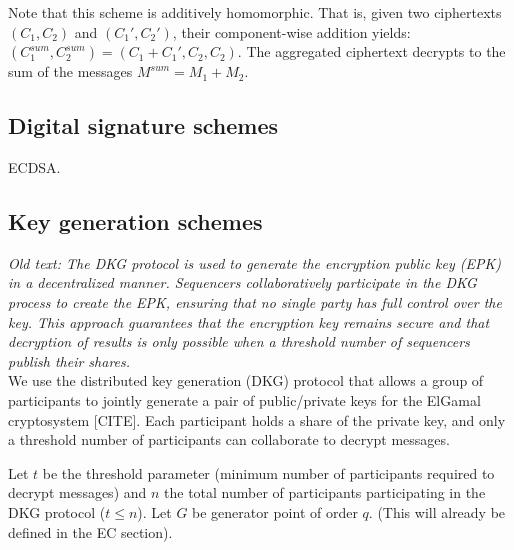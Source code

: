 Note that this scheme is additively homomorphic. That is, given two ciphertexts $(C_1, C_2)$ and $(C_1', C_2')$, their component-wise addition yields: $(C_1^{sum}, C_2^{sum}) = (C_1 + C_1', C_2, C_2)$. The aggregated ciphertext decrypts to the sum of the messages $M^{sum} = M_1 + M_2$.



\subsection{Digital signature schemes}
\label{sec:cryptographic-primitives:signatures}

ECDSA.

\subsection{Key generation schemes}
\label{sec:cryptographic-primitives:dkg}

\textit{Old text: The DKG protocol is used to generate the encryption public key (EPK) in a decentralized manner. Sequencers collaboratively participate in the DKG process to create the EPK, ensuring that no single party has full control over the key. This approach guarantees that the encryption key remains secure and that decryption of results is only possible when a threshold number of sequencers publish their shares.}\\

We use the distributed key generation (DKG) protocol that allows a group of participants to jointly generate a pair of public/private keys for the ElGamal cryptosystem [CITE]. Each participant holds a share of the private key, and only a threshold number of participants can collaborate to decrypt messages. 


Let $t$ be the threshold parameter (minimum number of participants required to decrypt messages) and $n$ the total number of participants participating in the DKG protocol ($t \leq n$). Let $G$ be generator point of order $q$. (This will already be defined in the EC section).

